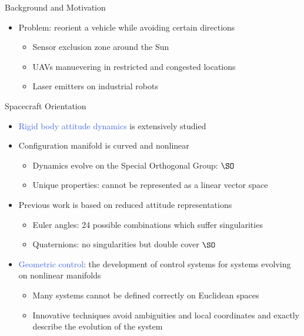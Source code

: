 \documentclass[final, usenames, dvipsnames]{beamer}
\newlength{\onecolwidth}
\def\Emph{\textcolor{RoyalBlue}}
\begin{document}
\begin{frame}[t]
\begin{columns}[T,onlytextwidth]
\begin{column}{\onecolwidth}
\begin{block}{Background and Motivation}
	\begin{itemize}
		\item Problem: reorient a vehicle while avoiding certain directions
		\begin{itemize}
			\item Sensor exclusion zone around the Sun
			\item UAVs manuevering in restricted and congested locations
			\item Laser emitters on industrial robots
		\end{itemize}
	\end{itemize}
\end{block} %

\begin{block}{Spacecraft Orientation}
	\begin{itemize}
		\item \Emph{Rigid body attitude dynamics} is extensively studied
		\item Configuration manifold is curved and nonlinear
			\begin{itemize}
				\item Dynamics evolve on the Special Orthogonal Group: \( \SO \)
				\item Unique properties: cannot be represented as a linear vector space
			\end{itemize}
		\item Previous work is based on reduced attitude representations
			\begin{itemize}
				\item Euler angles: 24 possible combinations which suffer singularities
				\item Quaternions: no singularities but double cover \( \SO \)
			\end{itemize}
		\item \Emph{Geometric control}: the development of control systems for systems evolving on nonlinear manifolds
			\begin{itemize}
				\item Many systems cannot be defined correctly on Euclidean spaces
				\item Innovative techniques avoid ambiguities and local coordinates and exactly describe the evolution of the system
			\end{itemize}
		
	\end{itemize}
\end{block} 


\end{column}
\end{columns}
\end{frame}
\end{document}
